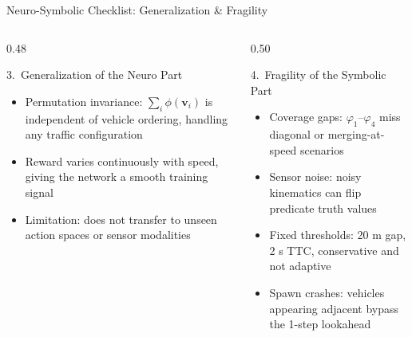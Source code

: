 \documentclass[aspectratio=169,10pt]{beamer}
\begin{document}
\begin{frame}{Neuro-Symbolic Checklist: Generalization \& Fragility}
  \begin{columns}[T]
    \begin{column}{0.48\textwidth}
      \begin{block}{3.\ Generalization of the Neuro Part}
        \begin{itemize}[<2->]\small
          \item Permutation invariance: \(\sum_i\phi(\mathbf{v}_i)\) is independent of vehicle ordering, handling any traffic configuration
          \item Reward varies continuously with speed, giving the network a smooth training signal
          \item Limitation: does not transfer to unseen action spaces or sensor modalities
        \end{itemize}
      \end{block}
    \end{column}
    \begin{column}{0.50\textwidth}
      \pause
      \begin{alertblock}{4.\ Fragility of the Symbolic Part}
        \begin{itemize}[<+->]\small
          \item Coverage gaps: \(\varphi_1\)--\(\varphi_4\) miss diagonal or merging-at-speed scenarios
          \item Sensor noise: noisy kinematics can flip predicate truth values
          \item Fixed thresholds: 20 m gap, 2 s TTC, conservative and not adaptive
          \item Spawn crashes: vehicles appearing adjacent bypass the 1-step lookahead
        \end{itemize}
      \end{alertblock}
    \end{column}
  \end{columns}
\end{frame}
\end{document}
